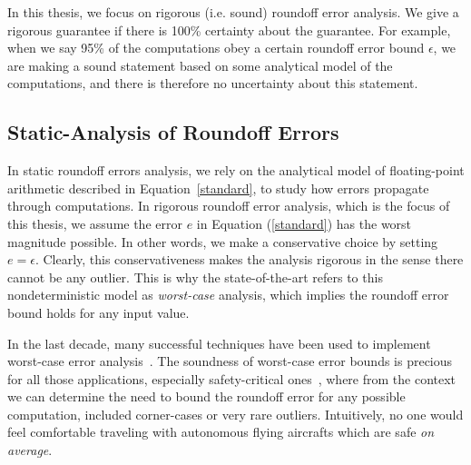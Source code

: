 In this thesis, we focus on rigorous (i.e. sound) roundoff error analysis.
%
We give a rigorous guarantee if there is 100\% certainty about the guarantee.
%
%
For example, when we say 95\% of the computations obey a certain roundoff error bound $\epsilon$, we are making a sound statement based on some analytical model of the computations, and there is therefore no uncertainty about this statement.
%
%
\subsection{Static-Analysis of Roundoff Errors}
\label{sec:worst}
%
In static roundoff errors analysis, we rely on the analytical model of floating-point arithmetic described in Equation~\ref{standard}, to study how errors propagate through computations.
%
In rigorous roundoff error analysis, which is the focus of this thesis, we assume the error $e$ in Equation (\ref{standard}) has the worst magnitude possible. In other words, we make a conservative choice by setting $e=\epsilon$.
%
Clearly, this conservativeness makes the analysis rigorous in the sense there cannot be any outlier.
%
This is why the state-of-the-art refers to this nondeterministic model as \emph{worst-case} analysis, which implies the roundoff error bound holds for any input value.
%

In the last decade, many successful techniques have been used to implement worst-case error analysis~\cite{darulova2018daisy,2015_fm_sjrg,solovyev2018rigorous,rosa,fptuner,smartfloat,satire,gappa,fluctuat}.
%
%
The soundness of worst-case error bounds is precious for all those applications, especially safety-critical ones~\cite{guardstable, cpralg}, where from the context we can determine the need to bound the roundoff error for any possible computation, included corner-cases or very rare outliers.
%
Intuitively, no one would feel comfortable traveling with autonomous flying aircrafts which are safe \emph{on average}.

